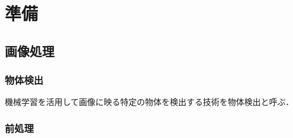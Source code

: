 \documentclass[11pt,a4j]{jreport}
\begin{document}
\chapter{準備}

\section{画像処理}
\subsection{物体検出}
機械学習を活用して画像に映る特定の物体を検出する技術を物体検出と呼ぶ．


\subsection{前処理}

\end{document}
